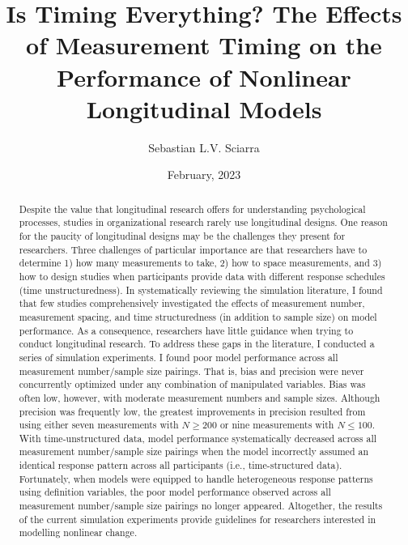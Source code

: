 \documentclass[
12pt, %
twoside,
english]{guelphthesis}
\title{Is Timing Everything? The Effects of Measurement Timing on the Performance of Nonlinear Longitudinal Models}
\author{Sebastian L.V. Sciarra}
\date{February, 2023}
\let\cleardoublepage\clearpage
\let\oldfrontmatter\frontmatter
\renewcommand{\frontmatter}{
  \oldfrontmatter
  
  
   \pagestyle{frontmatter} %
}
\begin{document}
\frontmatter %

  \maketitle

\setcounter{page}{2} %

\cleardoublepage
\thispagestyle{empty} %
  \begin{abstract}{2}{Despite the value that longitudinal research offers for understanding psychological processes, studies in organizational research rarely use longitudinal designs. One reason for the paucity of longitudinal designs may be the challenges they present for researchers. Three challenges of particular importance are that researchers have to determine 1) how many measurements to take, 2) how to space measurements, and 3) how to design studies when participants provide data with different response schedules (time unstructuredness). In systematically reviewing the simulation literature, I found that few studies comprehensively investigated the effects of measurement number, measurement spacing, and time structuredness (in addition to sample size) on model performance. As a consequence, researchers have little guidance when trying to conduct longitudinal research. To address these gaps in the literature, I conducted a series of simulation experiments. I found poor model performance across all measurement number/sample size pairings. That is, bias and precision were never concurrently optimized under any combination of manipulated variables. Bias was often low, however, with moderate measurement numbers and sample sizes. Although precision was frequently low, the greatest improvements in precision resulted from using either seven measurements with \(N \ge 200\) or nine measurements with \(N \le 100\). With time-unstructured data, model performance systematically decreased across all measurement number/sample size pairings when the model incorrectly assumed an identical response pattern across all participants (i.e., time-structured data). Fortunately, when models were equipped to handle heterogeneous response patterns using definition variables, the poor model performance observed across all measurement number/sample size pairings no longer appeared. Altogether, the results of the current simulation experiments provide guidelines for researchers interested in modelling nonlinear change.}  %

  \end{abstract}
\end{document}
